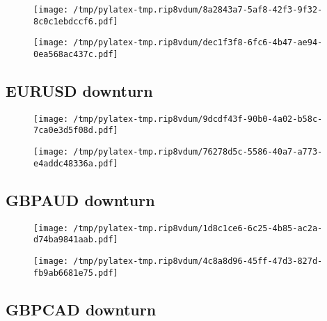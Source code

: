\documentclass{article}%
\begin{document}
\begin{figure}[htbp]%
\centering%
\texttt{[image: /tmp/pylatex-tmp.rip8vdum/8a2843a7-5af8-42f3-9f32-8c0c1ebdccf6.pdf]}%
\end{figure}

%


\begin{figure}[htbp]%
\centering%
\texttt{[image: /tmp/pylatex-tmp.rip8vdum/dec1f3f8-6fc6-4b47-ae94-0ea568ac437c.pdf]}%
\end{figure}

%
\newpage %
\subsection{EURUSD downturn}%
\label{subsec:EURUSDdownturn}%


\begin{figure}[htbp]%
\centering%
\texttt{[image: /tmp/pylatex-tmp.rip8vdum/9dcdf43f-90b0-4a02-b58c-7ca0e3d5f08d.pdf]}%
\end{figure}

%


\begin{figure}[htbp]%
\centering%
\texttt{[image: /tmp/pylatex-tmp.rip8vdum/76278d5c-5586-40a7-a773-e4addc48336a.pdf]}%
\end{figure}

%
\newpage %
\subsection{GBPAUD downturn}%
\label{subsec:GBPAUDdownturn}%


\begin{figure}[htbp]%
\centering%
\texttt{[image: /tmp/pylatex-tmp.rip8vdum/1d8c1ce6-6c25-4b85-ac2a-d74ba9841aab.pdf]}%
\end{figure}

%


\begin{figure}[htbp]%
\centering%
\texttt{[image: /tmp/pylatex-tmp.rip8vdum/4c8a8d96-45ff-47d3-827d-fb9ab6681e75.pdf]}%
\end{figure}

%
\newpage %
\subsection{GBPCAD downturn}%
\label{subsec:GBPCADdownturn}%
\end{document}
